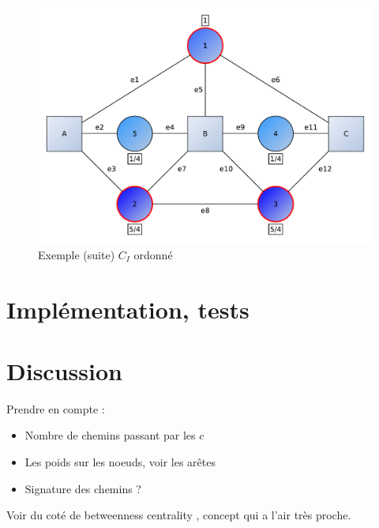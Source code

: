 \citep{Brandes01afaster} \citep{freeman77}

\begin{figure}[H!]
	\centering
	\includegraphics[scale=0.60]{./img/exemple1suite}
	\caption{Exemple (suite) $C_{I}$ ordonné}
	\label{fig:exemple1suite}
\end{figure}

\section{Implémentation, tests}

\section{Discussion}

\begin{todo} Prendre en compte :
	\begin{itemize}
		\item Nombre de chemins passant par les $c$
		\item Les poids sur les noeuds, voir les arêtes
		\item Signature des chemins ?
	\end{itemize}
	Voir du coté de \og betweenness centrality \fg, concept qui a l'air très proche.
\end{todo}

